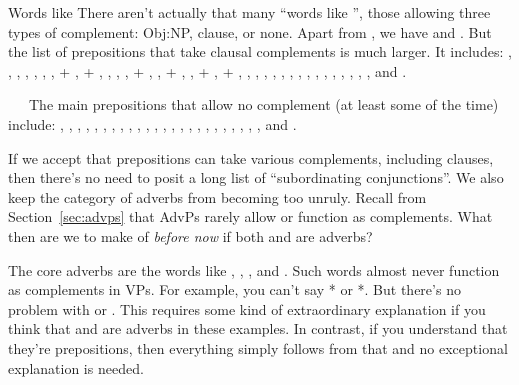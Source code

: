 \begin{tblsframed}{Words like }
   There aren't actually that many  \enquote{words like }, those allowing three types of complement: Obj:NP, clause, or none. Apart from , we have  and . But the list of prepositions that take clausal complements is much larger. It includes: , , , , 
       , , 
       , 
        + , 
        + , 
       ,
       , 
       ,  + , ,  + , 
       ,  + ,  + , , , 
       , , , , , 
       , , 
       , , 
       , , , , and .

   ~~~The main prepositions that allow no complement (at least some of the time) include:
   , , , , , , , , , , , , , , , , , , , , , , , , and .
\end{tblsframed}

If we accept that prepositions can take various complements, including clauses, then there's no need to posit a long list of \enquote{subordinating conjunctions}. We also keep the category of adverbs from becoming too unruly. Recall from Section~\ref{sec:advps} that AdvPs rarely allow or function as complements. What then are we to make of \textit{before \emph{now}} if both  and  are adverbs?

The core adverbs are the  words like , , , and . Such words almost never function as complements in  VPs. For example, you can't say * or *. But there's no problem with  or . This requires some kind of extraordinary explanation if you think that  and  are adverbs in these examples. In contrast, if you understand that they're prepositions, then everything simply follows from that and no exceptional explanation is needed.

